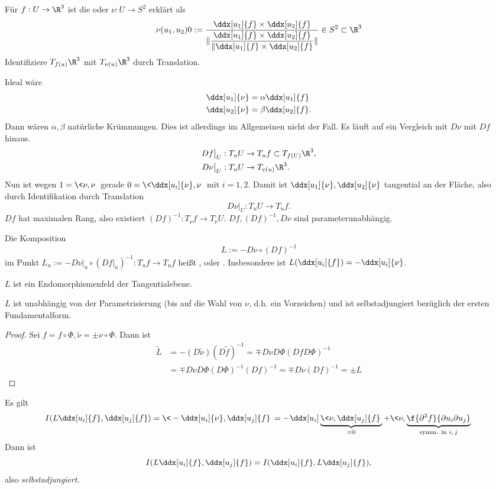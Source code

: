 \begin{df}
	Für $f: U \to \R^3$ ist die  oder  $\nu: U \to S^2$ erklärt als
	\[
		\nu(u_1, u_2)0:= \dfrac{\ddx[u_1]{f} \times \ddx[u_2]{f}}{\|\dfrac{\ddx[u_1]{f} \times \ddx[u_2]{f}}{\|\ddx[u_1]{f} \times \ddx[u_2]{f}}\|} \in S^2 \subset \R^3
	\]
	Identifiziere $T_{f(u)} \R^3$ mit $T_{\nu(u)}\R^3$ durch Translation.
\end{df}

Ideal wäre
\begin{align*}
	\ddx[u_1]{\nu} &= \alpha \ddx[u_1]{f} \\
	\ddx[u_2]{\nu} &= \beta \ddx[u_2]{f}.
\end{align*}
Dann wären $\alpha, \beta$ natürliche Krümmungen.
Dies ist allerdings im Allgemeinen nicht der Fall.
Es läuft auf ein Vergleich mit $D\nu$ mit $Df$ hinaus.
\begin{align*}
	Df\big|_U : T_u U  &\bijto T_u f \subset T_{f(U)} \R^3, \\
	D\nu\big|_U : T_u U &\to T_{v(u)} \R^3.
\end{align*}
Nun ist wegen $1 = \<\nu, \nu\>$ gerade $0 = \<\ddx[u_i]{\nu}, \nu\>$ mit $i = 1,2$.
Damit ist $\ddx[u_1]{\nu}, \ddx[u_2]{\nu}$ tangential an der Fläche, also durch Identifikation durch Translation
\[
	D\nu\big|_U : T_u U \to T_u f.
\]
$Df$ hat maximalen Rang, also existiert $(Df)^{-1}: T_\nu f \to T_\nu U$.
$Df, (Df)^{-1}, D\nu$ sind parameterunabhängig.

\begin{df}[Weingartenabbildung]
	Die Komposition
	\[
		L := -D\nu \circ (Df)^{-1}
	\]
	im Punkt $L_u := -D\nu\big|_u \circ (Df\big|_u)^{-1} : T_u f \to T_u f$ heißt , oder .
	Insbesondere ist $L(\ddx[u_i]{f}) = - \ddx[u_i]{\nu}$.
\end{df}

$L$ ist ein Endomorphismenfeld der Tangentialebene.

\begin{lem}
	$L$ ist unabhängig von der Parametrisierung (bis auf die Wahl von $\nu$, d.h. ein Vorzeichen) und ist selbstadjungiert bezüglich der ersten Fundamentalform.
	\begin{proof}
		Sei $f = f \circ \Phi, \tilde \nu = \pm \nu \circ \Phi$.
		Dann ist
		\begin{align*}
			\tilde L
			&= -(D \tilde \nu) (D \tilde f)^{-1}
			= \mp D\nu D\Phi (Df D\Phi)^{-1} \\
			&= \mp D\nu D\Phi (D\Phi)^{-1} (Df)^{-1}
			= \mp D\nu (Df)^{-1}
			= \pm L
		\end{align*}
	\end{proof}
	Es gilt
	\[
		I(L \ddx[u_i]{f}, \ddx[u_j]{f})
		= \< - \ddx[u_i]{\nu}, \ddx[u_j]{f} \>
		= - \ddx[u_i]\underbrace{\<\nu, \ddx[u_j]{f}\>}_{=0} + \<\nu, \underbrace{\f{\partial^2 f}{\partial u_i \partial u_j}}_{\text{symm. in $i,j$}} \>
	\]
	Dann ist
	\[
		I(L \ddx[u_i]{f}, \ddx[u_j]{f})
		= I(\ddx[u_i]{f}, L \ddx[u_j]{f}),
	\]
	also \emph{selbstadjungiert.}
\end{lem}








